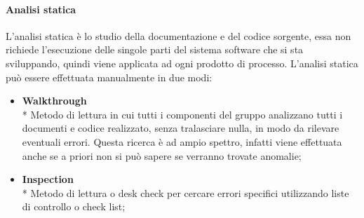 		\paragraph{Analisi statica}
			L'analisi statica è lo studio della documentazione e del codice sorgente, essa non richiede l'esecuzione delle singole parti del sistema software che si sta sviluppando, quindi viene applicata ad ogni prodotto di processo. L'analisi statica può essere effettuata manualmente in due modi:
			\begin{itemize}
				\item \textbf{Walkthrough} \\*
					Metodo di lettura in cui tutti i componenti del gruppo analizzano tutti i documenti e codice realizzato, senza tralasciare nulla, in modo da rilevare eventuali errori. Questa ricerca è ad ampio spettro, infatti viene effettuata anche se a priori non si può sapere se verranno trovate anomalie;
				\item \textbf{Inspection} \\*
					Metodo di lettura o desk check per cercare errori specifici utilizzando liste di controllo o check list;
			\end{itemize} 
